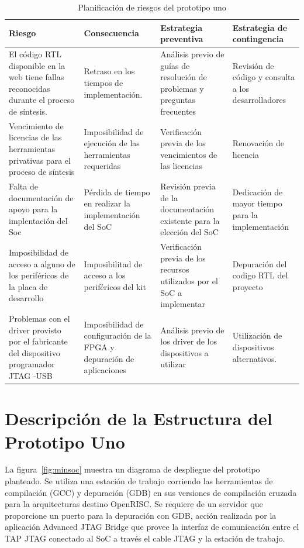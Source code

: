 		\begin{table}[h!]
		\centering
		\begin{tabular}{ p{4cm} p{4cm} p{4cm} p{3cm} }
		\hline 
		\rowcolor[gray]{0.8} Riesgo & Consecuencia & Estrategia preventiva & Estrategia de contingencia\\
		\hline
		El código RTL disponible en la web tiene fallas reconocidas durante el proceso de síntesis.&Retraso en los tiempos de implementación.& Análisis
		previo de guías de resolución de problemas y preguntas frecuentes & Revisión de código y consulta a los desarrolladores \\
		\hline
		Vencimiento de licencias de las herramientas privativas para el proceso de síntesis & Imposibilidad de ejecución de las herramientas requeridas & Verificación previa de los vencimientos de las licencias & Renovación de licencia \\	 
		\hline
		Falta de documentación de apoyo para la implentación
del Soc& Pérdida de tiempo en realizar la implementación
del SoC & Revisión previa de la documentación existente para la elección del
SoC & Dedicación de mayor tiempo para la implementación\\ 
		\hline
		 Imposibilidad de acceso a alguno de los periféricos de la placa de desarrollo & Imposibilitad de acceso a los periféricos del kit &Verificación previa de los recursos utilizados por el SoC a implementar & Depuración del codigo RTL del proyecto\\		
		\hline
		Problemas con el driver provisto por el fabricante del  dispositivo programador JTAG -USB  & Imposibilidad de configuración de la FPGA y depuración de aplicaciones &Análisis previo de los driver de los dispositivos a utilizar &  Utilización de dispositivos alternativos.\\		
		\hline
		\end{tabular}
		\caption{Planificación de riesgos del prototipo uno}
		\label{tab:planificación}
		\end{table}



		\newpage
		\section{Descripción de la Estructura del Prototipo Uno}
			
		La figura~\ref{fig:minsoc} muestra un diagrama de despliegue del prototipo planteado. Se utiliza una estación de trabajo corriendo las herramientas
		de compilación (GCC) y depuración (GDB) en sus versiones de compilación cruzada para la arquitecturas destino OpenRISC. Se requiere de un servidor que
		proporcione un puerto para la depuración con GDB, acción realizada por la aplicación Advanced JTAG Bridge que provee la interfaz de comunicación
		entre el TAP JTAG conectado al SoC a través el cable JTAG y la estación de trabajo.

